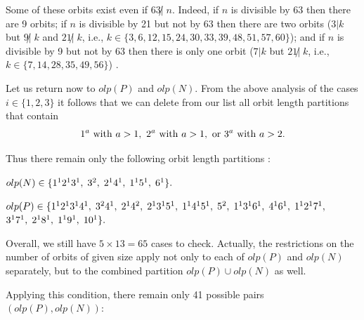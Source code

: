 {\begin{enumerate}
    Some of these orbits exist even if $63 \not | \; n$. Indeed, 
    if $n$ is divisible by 63 then there are 9 orbits; if $n$ is  
    divisible by 21 but not by 63 then there are two orbits ($3 | k $ but 
    $9 \not| \; k$ and $21 \not| \; k$, i.e., $k \in \{3,6,12,15,24,30,33,39,48,51,57,60\}$); and if $n$ is divisible
    by 9 but not by 63 then there is only one orbit ($7 | k $ but $21 \not| \; k$, i.e., $k \in \{7,14,28,35,49,56\}$) .
 
\end{enumerate}

    

Let us return now to $olp(P)$ and $olp(N)$. From the above analysis 
of the cases $i \in \{1,2,3\}$  it follows that we can delete
from our list all orbit length partitions that contain 
$$ 1^{a} \ {\rm with}\ a>1, \ 2^{a}  \  {\rm with} \ a>1, \ {\rm or} \ 3^{a} \ {\rm with} \ a>2. $$

Thus there remain only the following orbit length partitions :


\begin{flushleft}
$ olp(N) \in \small{\{ 1^{1}2^{1}3^{1},\;  3^{2},\;  2^{1}4^{1},\; 1^{1}5^{1},\; 6^{1} \}}. $

$ olp(P) \in \small{\{ 1^{1}2^{1}3^{1}4^{1},\; 3^{2}4^{1},\; 2^{1}4^{2},\; 2^{1}3^{1}5^{1},\;
   1^{1}4^{1}5^{1},\; 5^{2},\; 1^{1}3^{1}6^{1},\; 4^{1}6^{1}, \;1^{1}2^{1}7^{1},\; }$ \\
   $\small{3^{1}7^{1},\; 2^{1}8^{1},\; 1^{1}9^{1},\;  10^{1} \}}.$

\end{flushleft}

Overall, we still have $ 5 \times 13=65 $ cases to check.
Actually, the restrictions on the number of orbits of given size apply not only
to each of $olp(P)$ and $olp(N)$ separately, but to the combined partition $olp(P) \cup olp(N)$ as well. 




Applying this condition, there remain only 41 possible pairs $(olp(P), olp(N))$: 

}

